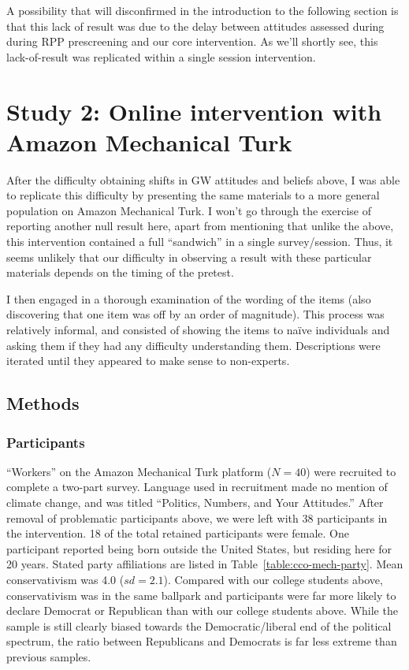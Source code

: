 A possibility that will disconfirmed in the introduction to the following
section is that this lack of result was due to the delay between attitudes
assessed during during RPP prescreening and our core intervention. As we'll
shortly see, this lack-of-result was replicated within a single session
intervention.

\section{Study 2: Online intervention with Amazon Mechanical Turk}
\label{sec:pro-mturk}

After the difficulty obtaining shifts in GW attitudes and beliefs above, I was
able to replicate this difficulty by presenting the same materials to a more
general population on Amazon Mechanical Turk. I won't go through the
exercise of reporting another null result here, apart from mentioning that
unlike the above, this intervention contained a full “sandwich” in a single
survey/session. Thus, it seems unlikely that our difficulty in observing a
result with these particular materials depends on the timing of the pretest.

I then engaged in a thorough examination of the wording of the items (also
discovering that one item was off by an order of magnitude). This process was
relatively informal, and consisted of showing the items to naïve individuals and
asking them if they had any difficulty understanding them. Descriptions were
iterated until they appeared to make sense to non-experts.

\subsection{Methods}

\subsubsection{Participants}
\label{sec:CCO-ndi-participants}

“Workers” on the Amazon Mechanical Turk platform ($N=40$) were recruited to
complete a two-part survey. Language used in recruitment made no mention of
climate change, and was titled “Politics, Numbers, and Your Attitudes.” After
removal of problematic participants above, we were left with 38 participants in
the intervention. 18 of the total retained participants were female. One
participant reported being born outside the United States, but residing here for
20 years. Stated party affiliations are listed in
Table~\ref{table:cco-mech-party}. Mean conservativism was 4.0 ($sd=2.1$).
Compared with our college students above, conservativism was in the same
ballpark and participants were far more likely to declare Democrat or Republican
than with our college students above. While the sample is still clearly biased
towards the Democratic/liberal end of the political spectrum, the ratio
between Republicans and Democrats is far less extreme than previous samples. 

